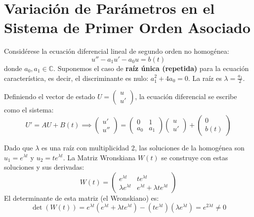 ﻿\section{Variación de Parámetros en el Sistema de Primer Orden Asociado}

Considérese la ecuación diferencial lineal de segundo orden no homogénea:
\[
    u'' - a_1 u' - a_0 u = b(t) \label{eq:edo_original}
\] 
donde $a_0, a_1 \in \mathbb{C}$. Suponemos el caso de \textbf{raíz única (repetida)} para la ecuación característica, es decir, el discriminante es nulo: $a_1^2 + 4a_0 = 0$. La raíz es $\lambda = \frac{a_1}{2}$.

Definiendo el vector de estado $U = \begin{pmatrix} u \\ u' \end{pmatrix}$, la ecuación diferencial se escribe como el sistema:
\[
    U' = A U + B(t) \implies 
    \begin{pmatrix} u' \\ u'' \end{pmatrix} = 
    \begin{pmatrix} 0 & 1 \\ a_0 & a_1 \end{pmatrix} 
    \begin{pmatrix} u \\ u' \end{pmatrix} + 
    \begin{pmatrix} 0 \\ b(t) \end{pmatrix}
\]

Dado que $\lambda$ es una raíz con multiplicidad 2, las soluciones de la homogénea son $u_1 = e^{\lambda t}$ y $u_2 = t e^{\lambda t}$. La Matriz Wronskiana $W(t)$ se construye con estas soluciones y sus derivadas:
\[
    W(t) = \begin{pmatrix}
        e^{\lambda t} & t e^{\lambda t} \\
        \lambda e^{\lambda t} & e^{\lambda t} + \lambda t e^{\lambda t}
    \end{pmatrix}
\]
El determinante de esta matriz (el Wronskiano) es:
\[
    \det (W(t)) = e^{\lambda t}(e^{\lambda t} + \lambda t e^{\lambda t}) - (t e^{\lambda t})(\lambda e^{\lambda t}) = e^{2 \lambda t} \neq 0
\]

